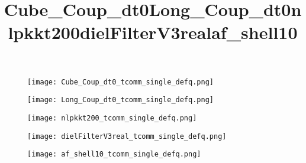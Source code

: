 \begin{figure}[H]
    \title{Cube\_Coup\_dt0}
    \begin{center}
        \texttt{[image: Cube\_Coup\_dt0\_tcomm\_single\_defq.png]}
    \end{center}
    \caption{}
    \label{fig:Cube_Coup_dt0_tcomm_single_defq.png}
\end{figure}

\begin{figure}[H]
    \title{Long\_Coup\_dt0}
    \begin{center}
        \texttt{[image: Long\_Coup\_dt0\_tcomm\_single\_defq.png]}
    \end{center}
    \caption{}
    \label{fig:Long_Coup_dt0_tcomm_single_defq.png}
\end{figure}

\begin{figure}[H]
    \title{nlpkkt200}
    \begin{center}
        \texttt{[image: nlpkkt200\_tcomm\_single\_defq.png]}
    \end{center}
    \caption{}
    \label{fig:nlpkkt200_defq_tcomm_single.png}
\end{figure}

\begin{figure}[H]
    \title{dielFilterV3real}
    \begin{center}
        \texttt{[image: dielFilterV3real\_tcomm\_single\_defq.png]}
    \end{center}
    \caption{}
    \label{fig:dielFilterV3real_tcomm_single_defq.png}
\end{figure}

\begin{figure}[H]
    \title{af\_shell10}
    \begin{center}
        \texttt{[image: af\_shell10\_tcomm\_single\_defq.png]}
    \end{center}
    \caption{}
    \label{fig:af_shell10_defq_tcomm_single.png}
\end{figure}




